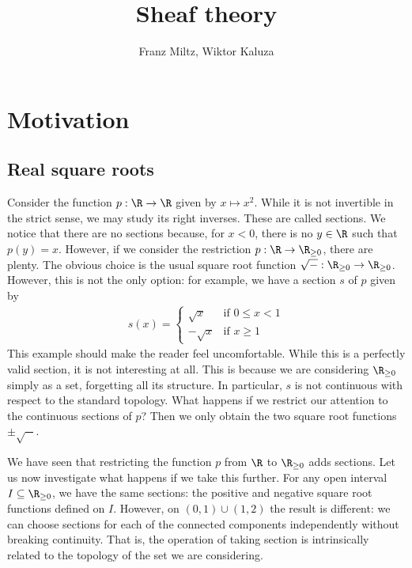 \documentclass{article}
\author{Franz Miltz, Wiktor Kaluza}
\title{Sheaf theory}
\begin{document}
\maketitle
\tableofcontents
\pagebreak

\section{Motivation}\label{sec:motivation}

\subsection{Real square roots}

Consider the function $p:\R\to\R$ given by $x\mapsto x^2$. While it is
not invertible in the strict sense, we may study its right inverses.
These are called sections. We notice that there are no sections because,
for $x < 0$, there is no $y\in\R$ such that $p(y) = x$. However,
if we consider the restriction $p:\R\to\R_{\geq 0}$, there are plenty.
The obvious choice is the usual square root function
$\sqrt{-} : \R_{\geq 0} \to \R_{\geq 0}$. However, this is not the only option:
for example, we have a section $s$ of $p$ given by
\begin{align*}
  s(x) = \begin{cases}
    \sqrt{x} & \text{if }0 \leq x<1 \\
    -\sqrt{x} & \text{if }x\geq 1
  \end{cases}
\end{align*}
This example should make the reader feel uncomfortable. While this is
a perfectly valid section, it is not interesting at all. This is because
we are considering $\R_{\geq 0}$ simply as a set, forgetting all its
structure. In particular, $s$ is not continuous with respect to the
standard topology.
What happens if we restrict our attention to the continuous sections
of $p$? Then we only obtain the two square root functions $\pm\sqrt{-}$.

We have seen that restricting the function $p$ from $\R$ to $\R_{\geq 0}$
adds sections. Let us now investigate what happens if we take this further.
For any open interval $I\subseteq\R_{\geq 0}$, we have the same sections:
the positive and negative square root functions defined on $I$. However,
on $(0,1)\cup(1,2)$ the result is different: we can choose sections for
each of the connected components independently without breaking continuity.
That is, the operation of taking section is intrinsically related to
the topology of the set we are considering.
\end{document}
